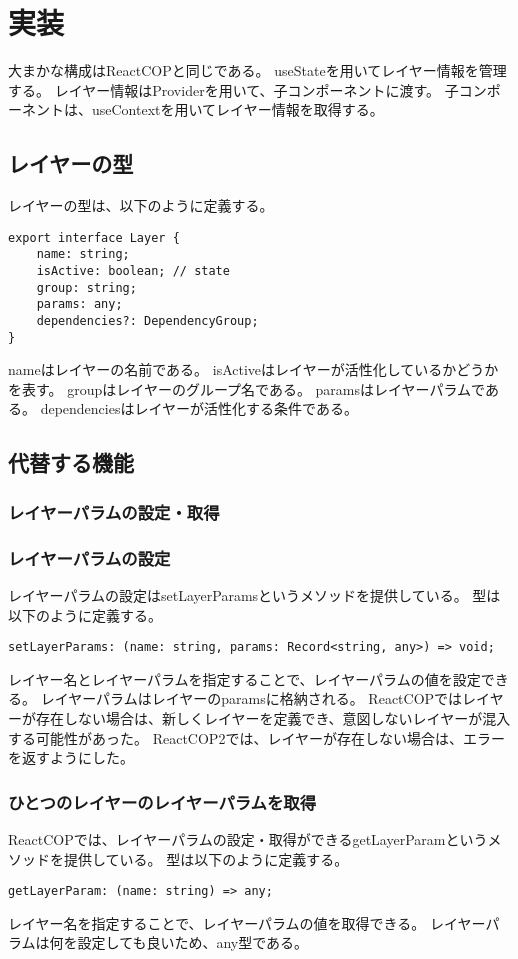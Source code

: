 \documentclass{jsarticle}
\begin{document}
\fi
\section{実装}
大まかな構成はReactCOPと同じである。
useStateを用いてレイヤー情報を管理する。
レイヤー情報はProviderを用いて、子コンポーネントに渡す。
子コンポーネントは、useContextを用いてレイヤー情報を取得する。

\subsection{レイヤーの型}
レイヤーの型は、以下のように定義する。
\begin{lstlisting}[caption=レイヤーの型]
export interface Layer {
    name: string;
    isActive: boolean; // state
    group: string;
    params: any;
    dependencies?: DependencyGroup;
}
\end{lstlisting}
nameはレイヤーの名前である。
isActiveはレイヤーが活性化しているかどうかを表す。
groupはレイヤーのグループ名である。
paramsはレイヤーパラムである。
dependenciesはレイヤーが活性化する条件である。

\subsection{代替する機能}
\subsubsection{レイヤーパラムの設定・取得}

\subsubsection{レイヤーパラムの設定}
レイヤーパラムの設定はsetLayerParamsというメソッドを提供している。
型は以下のように定義する。
\begin{lstlisting}[caption=setLayerParamsの型]
setLayerParams: (name: string, params: Record<string, any>) => void;
\end{lstlisting}
レイヤー名とレイヤーパラムを指定することで、レイヤーパラムの値を設定できる。
レイヤーパラムはレイヤーのparamsに格納される。
ReactCOPではレイヤーが存在しない場合は、新しくレイヤーを定義でき、意図しないレイヤーが混入する可能性があった。
ReactCOP2では、レイヤーが存在しない場合は、エラーを返すようにした。

\subsubsection{ひとつのレイヤーのレイヤーパラムを取得}
ReactCOPでは、レイヤーパラムの設定・取得ができるgetLayerParamというメソッドを提供している。
型は以下のように定義する。
\begin{lstlisting}[caption=getLayerParamの型]
getLayerParam: (name: string) => any;
\end{lstlisting}
レイヤー名を指定することで、レイヤーパラムの値を取得できる。
レイヤーパラムは何を設定しても良いため、any型である。
\end{document}
